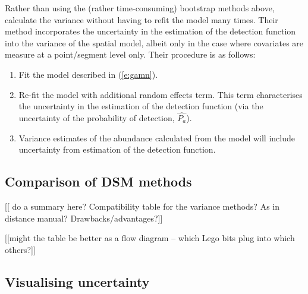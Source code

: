 \documentclass[a4paper,12pt]{article}
\begin{document}
Rather than using the (rather time-consuming) bootstrap methods above, \cite{WILLIAMS:2011in} calculate the variance without having to refit the model many times.  Their method incorporates the uncertainty in the estimation of the detection function into the variance of the spatial model, albeit only in the case where covariates are measure at a point/segment level only. Their procedure is as follows:
\begin{enumerate}
\item Fit the model described in (\ref{e:gamn}).
\item Re-fit the model with additional random effects term. This term characterises the uncertainty in the estimation of the detection function (via the uncertainty of the probability of detection, $\hat{P_a}$).
\item Variance estimates of the abundance calculated from the model will include uncertainty from estimation of the detection function.
\end{enumerate}


\subsection*{Comparison of DSM methods}

[[ do a summary here? Compatibility table for the variance methods? As in distance manual? Drawbacks/advantages?]]

[[might the table be better as a flow diagram -- which Lego bits plug into which others?]]



\subsection*{Visualising uncertainty}
\end{document}
